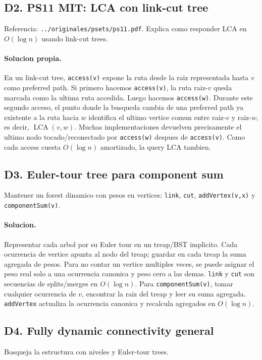 \documentclass[10pt]{article}
\newcommand{\bigO}{O}
\newcommand{\LCA}{\operatorname{LCA}}
\begin{document}
\subsection*{D2. PS11 MIT: LCA con link-cut tree}
Referencia: \texttt{../originales/psets/ps11.pdf}. Explica como responder LCA
en $\bigO(\log n)$ usando link-cut trees.

\paragraph{Solucion propia.}
En un link-cut tree, \texttt{access(v)} expone la ruta desde la raiz representada
hasta $v$ como preferred path. Si primero hacemos \texttt{access(v)}, la ruta
raiz-$v$ queda marcada como la ultima ruta accedida. Luego hacemos
\texttt{access(w)}. Durante este segundo acceso, el punto donde la busqueda
cambia de una preferred path ya existente a la ruta hacia $w$ identifica el
ultimo vertice comun entre raiz-$v$ y raiz-$w$, es decir, $\LCA(v,w)$. Muchas
implementaciones devuelven precisamente el ultimo nodo tocado/reconectado por
\texttt{access(w)} despues de \texttt{access(v)}. Como cada access cuesta
$\bigO(\log n)$ amortizado, la query LCA tambien.

\subsection*{D3. Euler-tour tree para component sum}
Mantener un forest dinamico con pesos en vertices: \texttt{link}, \texttt{cut},
\texttt{addVertex(v,x)} y \texttt{componentSum(v)}.

\paragraph{Solucion.}
Representar cada arbol por su Euler tour en un treap/BST implicito. Cada
ocurrencia de vertice apunta al nodo del treap; guardar en cada treap la suma
agregada de pesos. Para no contar un vertice multiples veces, se puede asignar
el peso real solo a una ocurrencia canonica y peso cero a las demas. \texttt{link}
y \texttt{cut} son secuencias de splits/merges en $\bigO(\log n)$. Para
\texttt{componentSum(v)}, tomar cualquier ocurrencia de $v$, encontrar la raiz
del treap y leer su suma agregada. \texttt{addVertex} actualiza la ocurrencia
canonica y recalcula agregados en $\bigO(\log n)$.

\subsection*{D4. Fully dynamic connectivity general}
Bosqueja la estructura con niveles y Euler-tour trees.
\end{document}
